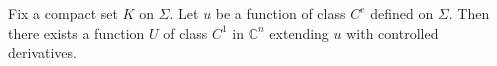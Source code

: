 
Fix a compact set $K$ on $\Sigma$. Let $u$ be a function of class $C^e$ defined on $\Sigma$. Then there exists a function $U$ of class $C^1$ in $\mathbb{C}^n$ extending $u$ with controlled derivatives.
